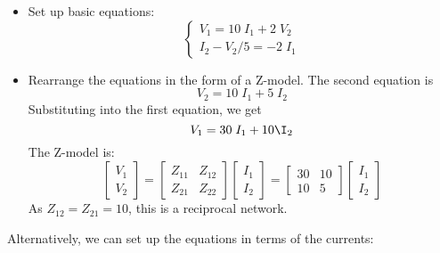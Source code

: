
\begin{itemize}
\item Set up basic equations:
\[	\left\{ \begin{array}{l} 
	V_1=10\;I_1+2\;V_2 \\ I_2-V_2/5=-2\;I_1 \end{array} \right. \]
\item Rearrange the equations in the form of a Z-model. The second equation is
\[	V_2=10\;I_1+5\;I_2	\]
Substituting into the first equation, we get
\[	V_1=30\;I_1+10\I_2	\]
The Z-model is:
\[	\left[ \begin{array}{l} V_1 \\ V_2 \end{array} \right]=
	\left[ \begin{array}{rr} Z_{11} & Z_{12} \\ Z_{21} & Z_{22} \end{array} \right]
	\left[ \begin{array}{l} I_1 \\ I_2 \end{array} \right]
=	\left[ \begin{array}{rr} 30 & 10 \\ 10 & 5 \end{array} \right]
	\left[ \begin{array}{l} I_1 \\ I_2 \end{array} \right]
\]
As $Z_{12}=Z_{21}=10$, this is a reciprocal network.
\end{itemize}
Alternatively, we can set up the equations in terms of the currents:
